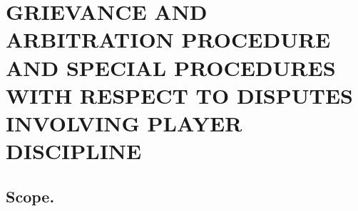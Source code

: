 \documentclass[
]{book}
\begin{document}
\hypertarget{grievance-and-arbitration-procedure-and-special-procedures-with-respect-to-disputes-involving-player-discipline}{%
\chapter{GRIEVANCE AND ARBITRATION PROCEDURE AND SPECIAL PROCEDURES WITH RESPECT TO DISPUTES INVOLVING PLAYER DISCIPLINE}\label{grievance-and-arbitration-procedure-and-special-procedures-with-respect-to-disputes-involving-player-discipline}}


\hypertarget{scope.}{%
\section{Scope.}\label{scope.}}
\end{document}
